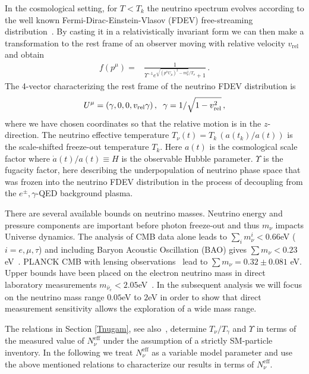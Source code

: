 In the cosmological setting, for $T<T_k$ the neutrino spectrum evolves according to the well known Fermi-Dirac-Einstein-Vlasov (FDEV) free-streaming  distribution~\cite{Langacker:1982,bruhat,Wong,Birrell:2013_2}.  By casting it in a relativistically invariant form we can then make a transformation to the rest frame of an observer moving with relative velocity $v_{\text{rel}}$ and obtain
\begin{align}\label{neutrino_dist_B}
f(p^\mu)=&\frac{1}{\Upsilon^{-1} e^{\sqrt{(p^\mu U_\mu)^2-m_\nu^2}/T_\nu}+1}\,.
\end{align}
The 4-vector characterizing the rest frame of the neutrino FDEV distribution is
\begin{equation}\label{4_vel}
U^\mu=(\gamma,0,0,v_{\text{rel}}\gamma)\,,\hspace{2mm} \gamma={1}/{\sqrt{1-v_{\text{rel}}^2}}\,,
\end{equation} 
where we have chosen coordinates so that the relative motion is in the $z$-direction. The neutrino effective temperature $T_\nu(t)= T_k\,(a(t_k)/a(t))$ is the scale-shifted freeze-out temperature $T_k$. Here $a(t)$ is the cosmological scale factor where $\dot a(t)/a(t)\equiv H$ is the observable Hubble parameter. $\Upsilon$ is the  fugacity factor, here describing the underpopulation of neutrino phase space that was frozen into the neutrino FDEV distribution in the process of decoupling from the $e^\pm,\gamma$-QED background  plasma.

There are several available bounds on neutrino masses. Neutrino energy and pressure components are important before photon freeze-out and thus $m_\nu$ impacts Universe dynamics. The analysis of CMB data alone leads to $\sum_i m_\nu^i<0.66$eV ($i=e,\mu,\tau$) and including Baryon Acoustic Oscillation (BAO) gives $\sum m_\nu<0.23$eV~\cite{Planck}.  {\small PLANCK CMB} with lensing observations~\cite{Battye:2013xqa} lead to  $\sum m_{\nu}=0.32\pm0.081$ eV. Upper bounds have been placed on the electron neutrino mass in direct laboratory measurements  $m_{\bar\nu_e}<2.05$eV~\cite{Beringer:1900zz,Aseev}.   In the subsequent analysis we will focus on the neutrino mass range $0.05$eV to $2$eV in order to show that direct measurement sensitivity allows the exploration of a wide mass range. 



 The relations in Section \ref{Tnugam}, see also~\cite{Birrell:2013_2}, determine $T_\nu/T_\gamma$ and  $\Upsilon$ in terms of the measured  value of  $N_\nu^{\mathrm{eff}}$ under the assumption of a strictly SM-particle inventory.  In the following we treat $N_\nu^{\mathrm{eff}}$  as a variable model parameter and use the above mentioned relations to characterize our results in terms of $N_\nu^{\mathrm{eff}}$.


